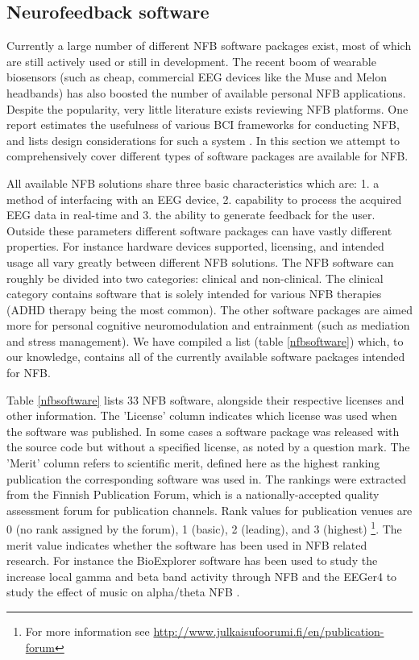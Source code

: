 \subsection{Neurofeedback software}
Currently a large number of different NFB software packages exist, most of which are still actively used or still in development. The recent boom of wearable biosensors (such as cheap, commercial EEG devices like the Muse and Melon headbands) has also boosted the number of available personal NFB applications. Despite the popularity, very little literature exists reviewing NFB platforms. One report estimates the usefulness of various BCI frameworks for conducting NFB, and lists design considerations for such a system  \cite{huster2014brain}. In this section we attempt to comprehensively cover different types of software packages are available for NFB.

All available NFB solutions share three basic characteristics which are: 1. a method of interfacing with an EEG device, 2. capability to process the acquired EEG data in real-time and 3. the ability to generate feedback for the user. Outside these parameters different software packages can have vastly different properties. For instance hardware devices supported, licensing, and intended usage all vary greatly between different NFB solutions. The NFB software can roughly be divided into two categories: clinical and non-clinical. The clinical category contains software that is solely intended for various NFB therapies (ADHD therapy being the most common). The other software packages are aimed more for personal cognitive neuromodulation and entrainment (such as mediation and stress management). We have compiled a list (table \ref{nfbsoftware}) which, to our knowledge, contains all of the currently available software packages intended for NFB. 

Table \ref{nfbsoftware} lists 33 NFB software, alongside their respective licenses and other information. 
The 'License' column indicates which license was used when the software was published. In some cases a software package was released with the source code but without a specified license, as noted by a question mark. 
The 'Merit' column refers to scientific merit, defined here as the highest ranking publication the corresponding software was used in. The rankings were extracted from the Finnish Publication Forum, which is a nationally-accepted quality assessment forum for publication channels. Rank values for publication venues are 0 (no rank assigned  by the forum), 1 (basic), 2 (leading), and 3 (highest) \footnote{For more information see \url{http://www.julkaisufoorumi.fi/en/publication-forum}}. The merit value indicates whether the software has been used in NFB related research. For instance the BioExplorer software has been used to study the increase local gamma and beta band activity through NFB \cite{keizer2010enhancing} and the EEGer4 to study the effect of music on alpha/theta NFB \cite{gruzelier2014replication}.

